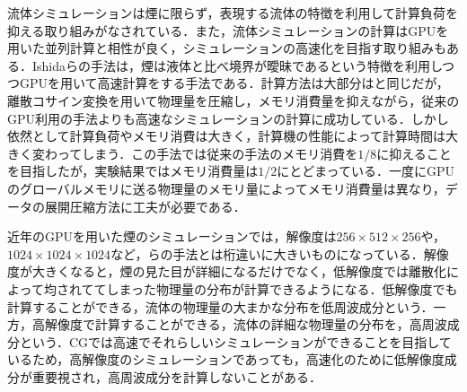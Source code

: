 \documentclass[10pt,a4paper,notitlepage,oneside,twocolumn]{abst_jsarticle}
\begin{document}
流体シミュレーションは煙に限らず，表現する流体の特徴を利用して計算負荷を抑える取り組みがなされている．また，流体シミュレーションの計算はGPUを用いた並列計算と相性が良く，シミュレーションの高速化を目指す取り組みもある．Ishidaらの手法\cite{GPU}は，煙は液体と比べ境界が曖昧であるという特徴を利用しつつGPUを用いて高速計算をする手法である．計算方法は大部分は\cite{fedkiew}と同じだが，離散コサイン変換を用いて物理量を圧縮し，メモリ消費量を抑えながら，従来のGPU利用の手法よりも高速なシミュレーションの計算に成功している．しかし依然として計算負荷やメモリ消費は大きく，計算機の性能によって計算時間は大きく変わってしまう．この手法では従来の手法のメモリ消費を$1/8$に抑えることを目指したが，実験結果ではメモリ消費量は$1/2$にとどまっている．一度にGPUのグローバルメモリに送る物理量のメモリ量によってメモリ消費量は異なり，データの展開圧縮方法に工夫が必要である．

近年のGPUを用いた煙のシミュレーションでは，解像度は$256\times512\times256$や，$1024\times1024\times1024$など，\cite{fedkiew}らの手法とは桁違いに大きいものになっている．解像度が大きくなると，煙の見た目が詳細になるだけでなく，低解像度では離散化によって均されててしまった物理量の分布が計算できるようになる．低解像度でも計算することができる，流体の物理量の大まかな分布を低周波成分という．一方，高解像度で計算することができる，流体の詳細な物理量の分布を，高周波成分という．CGでは高速でそれらしいシミュレーションができることを目指しているため，高解像度のシミュレーションであっても，高速化のために低解像度成分が重要視され，高周波成分を計算しないことがある．
\end{document}
